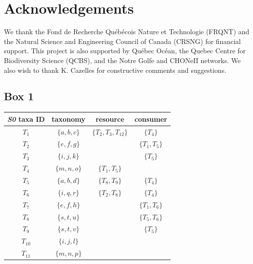 \documentclass[letterpaper]{article}
\begin{document}
\section{Acknowledgements}
We thank the Fond de Recherche Québécois Nature et Technologie (FRQNT) and the Natural Science and Engineering Council of Canada (CRSNG) for financial support. This project is also supported by Québec Océan, the Quebec Centre for Biodiversity Science (QCBS), and the Notre Golfe and CHONeII networks. We also wish to thank K. Cazelles for constructive comments and suggestions.

\newpage
\subsection{Box 1}
\newpage
    \begin{table}[h!]
      \centering
      \begin{tabular}{cccc}
        \hline
        \textit{S0} taxa ID & taxonomy &          resource &             consumer        \\
        \hline
        \hline
        $T_1$ &         $\{a, b, c\}$ &     $\{T_2, T_3, T_{12}\}$ &    $\{T_4\}$         \\
        $T_2$ &         $\{e, f, g\}$ &      &                           $\{T_1, T_5\}$    \\
        $T_3$ &         $\{i, j, k\}$ &      &                          $\{T_5\}$         \\
        $T_4$ &         $\{m, n, o\}$ &     $\{T_1, T_5\}$ &                              \\
        $T_5$ &         $\{a, b, d\}$ &     $\{T_8, T_9\}$ &            $\{T_4\}$         \\
        $T_6$ &         $\{i, q, r\}$ &     $\{T_2, T_8\}$ &            $\{T_4\}$         \\
        $T_7$ &         $\{e, f, h\}$ &      &                          $\{T_1, T_6\}$    \\
        $T_8$ &         $\{s, t, u\}$ &      &                          $\{T_5, T_6\}$    \\
        $T_9$ &         $\{s, t, v\}$ &      &                          $\{T_5\}$         \\
        $T_{10}$ &      $\{i, j, l\}$ &      &                                            \\
        $T_{11}$ &      $\{m, n, p\}$ &      &                                            \\

\end{tabular}
\end{table}
\end{document}
